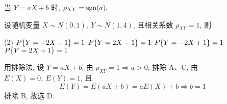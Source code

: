 \begin{theorem}
    当 $Y=aX+b$ 时, $\rho_{XY}=\mathrm{sgn}(a).$
\end{theorem}

\begin{example}
    设随机变量 $X\sim N(0,1),~Y\sim N(1,4)$, 且相关系数 $\rho_{XY}=1$, 则
    \begin{tasks}(2)
        \task $P\qty{Y=-2X -1}=1$
        \task $P\qty{Y=2X -1}=1$
        \task $P\qty{Y=-2X+1}=1$
        \task $P\qty{Y=2X+1}=1$
    \end{tasks}
\end{example}
\begin{solution}
    用排除法, 设 $Y=aX+b$, 由 $\rho_{XY}=1\Rightarrow a>0$, 排除 A、C, 
    由 $E(X)=0,~E(Y)=1$, 且 $$E(Y)=E(aX+b)=aE(X)+b\Rightarrow b=1$$
    排除 B, 故选 D.
\end{solution}